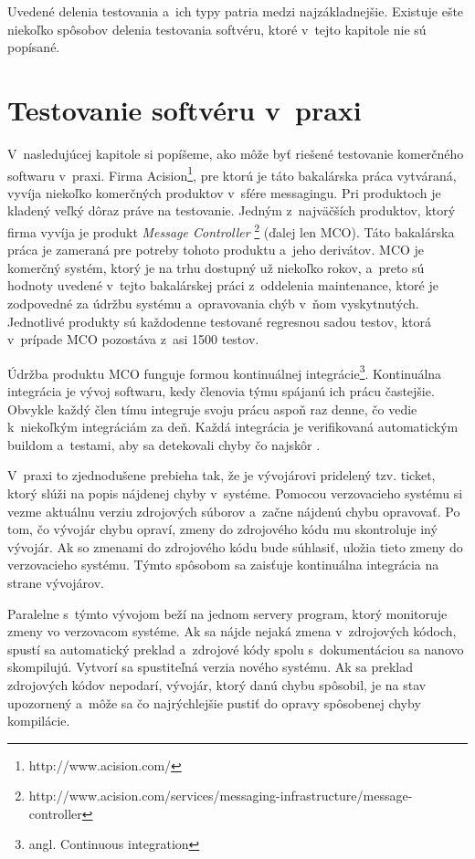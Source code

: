 Uvedené delenia testovania a~ich typy patria medzi najzákladnejšie. 
Existuje ešte niekoľko spôsobov delenia testovania softvéru, ktoré v~tejto kapitole nie sú popísané.



\section{Testovanie softvéru v~praxi} 
\label{sekcia:testovanie_v_praxi}

V~nasledujúcej kapitole si popíšeme, ako môže byť riešené testovanie komerčného softwaru v~praxi.
Firma Acision\footnote{http://www.acision.com/}, pre ktorú je táto bakalárska práca vytváraná, vyvíja niekoľko komerčných produktov
v~sfére messagingu. Pri produktoch je kladený veľký dôraz práve na testovanie.
Jedným z~najväčších produktov, ktorý firma vyvíja je produkt {\it Message Controller}
\footnote{http://www.acision.com/services/messaging-infrastructure/message-controller} (ďalej len MCO).
Táto bakalárska práca je zameraná pre potreby tohoto produktu a~jeho derivátov.
MCO je komerčný systém, ktorý je na trhu dostupný už niekoľko rokov, a~preto sú hodnoty uvedené v~tejto 
bakalárskej práci z~oddelenia maintenance, ktoré je zodpovedné za údržbu systému a~opravovania chýb v~ňom vyskytnutých.
Jednotlivé produkty sú každodenne testované regresnou sadou testov, ktorá v~prípade MCO pozostáva z~asi 1500 testov.

Údržba produktu MCO funguje formou kontinuálnej integrácie\footnote{angl. Continuous integration}.
Kontinuálna integrácia je vývoj softwaru, kedy členovia týmu spájanú ich prácu častejšie.
Obvykle každý člen tímu integruje svoju prácu aspoň raz denne, čo vedie k~niekoľkým integráciám za deň.
Každá integrácia je verifikovaná automatickým buildom a~testami, aby sa detekovali chyby čo najskôr \cite{Continuous_integration}.

V~praxi to zjednodušene prebieha tak, že je vývojárovi pridelený tzv. ticket, ktorý slúži na popis
nájdenej chyby v~systéme. Pomocou verzovacieho systému si vezme aktuálnu verziu zdrojových súborov a~začne nájdenú chybu opravovať.
Po tom, čo vývojár chybu opraví, zmeny do zdrojového kódu mu skontroluje iný vývojár.
Ak so zmenami do zdrojového kódu bude súhlasiť, uložia tieto zmeny do verzovacieho systému.
Týmto spôsobom sa zaisťuje kontinuálna integrácia na strane vývojárov.

Paralelne s~týmto vývojom beží na jednom servery program, ktorý monitoruje zmeny vo verzovacom systéme.
Ak sa nájde nejaká zmena v~zdrojových kódoch, spustí sa automatický preklad a~zdrojové kódy spolu s~dokumentáciou
sa nanovo skompilujú. Vytvorí sa spustiteľná verzia nového systému. Ak sa preklad zdrojových kódov nepodarí, vývojár, ktorý 
danú chybu spôsobil, je na stav upozornený a~môže sa čo najrýchlejšie pustiť do opravy spôsobenej chyby kompilácie.


